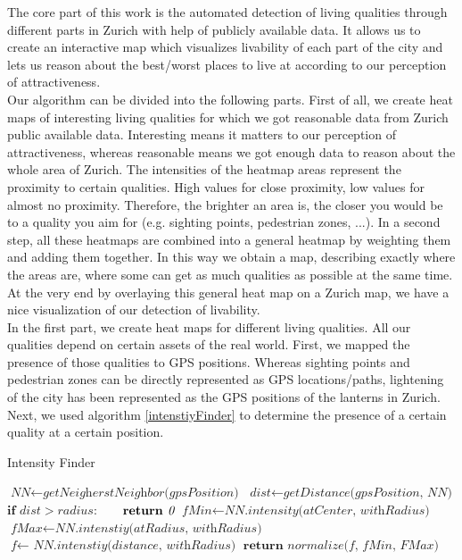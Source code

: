 \documentclass[letterpaper]{article}
\begin{document}
The core part of this work is the automated detection of living qualities through different parts in Zurich with help of publicly available data. It allows us to create an interactive map which visualizes livability of each part of the city and lets us reason about the best/worst places to live at according to our perception of attractiveness. 
\\
\indent Our algorithm can be divided into the following parts. First of all, we create heat maps of interesting living qualities for which we got reasonable data from Zurich public available data. Interesting means it matters to our perception of attractiveness, whereas reasonable means we got enough data to reason about the whole area of Zurich. The intensities of the heatmap areas represent the proximity to certain qualities. High values for close proximity, low values for almost no proximity. Therefore, the brighter an area is, the closer you would be to a quality you aim for (e.g. sighting points, pedestrian zones, ...).
In a second step, all these heatmaps are combined into a general heatmap by weighting them and adding them together. In this way we obtain a map, describing exactly where the areas are, where some can get as much qualities as possible at the same time. 
At the very end by overlaying this general heat map on a Zurich map, we have a nice visualization of our detection of livability.
\\
\indent In the first part, we create heat maps for different living qualities. All our qualities depend on certain assets of the real world. First, we mapped the presence of those qualities to GPS positions. Whereas sighting points and pedestrian zones can be directly represented as GPS locations/paths, lightening of the city has been represented as the GPS positions of the lanterns in Zurich. Next, we used algorithm \ref{intenstiyFinder} to determine the presence of a certain quality at a certain position.
\\
\begin{algorithm}
    \caption{Intensity Finder}\label{intenstiyFinder}
    \begin{algorithmic}[1]
            \State $\textit{NN} \gets \textit{getNeigherstNeighbor(gpsPosition)}$
            \State $\textit{dist} \gets \textit{getDistance(gpsPosition, NN)}$
            \State $\textbf{if } \textit{dist} > radius:$
            \State $\indent \textbf{return } \textit{0}$
			 \State $\textit{fMin} \gets \textit{NN.intensity(atCenter, withRadius)}$
			 \State $\textit{fMax} \gets \textit{NN.intenstiy(atRadius, withRadius)}$ 
			 \State $\textit{f} \gets \textit{ NN.intenstiy(distance, withRadius)}$   
			 \State $\textbf{return } \textit{normalize(f, fMin, FMax)}$
        \EndProcedure
    \end{algorithmic}
\end{algorithm}
\end{document}
